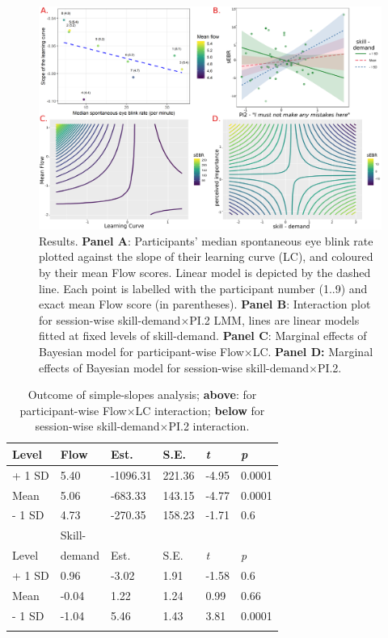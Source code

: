 \documentclass[10pt,letterpaper,floatsintext]{article}
\begin{document}
\begin{figure}[!t]
	\centering
	\includegraphics[width=\textwidth]{sEBR_RQ1-2_results}
	\caption{Results. \textbf{Panel A}: Participants' median spontaneous eye blink rate plotted against the slope of their learning curve (LC), and coloured by their mean Flow scores. Linear model is depicted by the dashed line. Each point is labelled with the participant number (1..9) and exact mean Flow score (in parentheses). \textbf{Panel B}: Interaction plot for session-wise skill-demand$\times$PI.2 LMM, lines are linear models fitted at fixed levels of skill-demand. \textbf{Panel C}: Marginal effects of Bayesian model for participant-wise Flow$\times$LC. \textbf{Panel D:} Marginal effects of Bayesian model for session-wise skill-demand$\times$PI.2.}
	\label{fig:EBRvLC}
\end{figure}


\begin{table}[!hb]
\centering
\caption{Outcome of simple-slopes analysis; \textbf{above}: for participant-wise Flow$\times$LC interaction; \textbf{below} for session-wise skill-demand$\times$PI.2 interaction.}
\begin{tabular}{llllll}
\hline
Level  & Flow & Est.     & S.E.   & \textit{t} & \textit{p} \\
\hline
+ 1 SD & 5.40 & -1096.31 & 221.36 & -4.95 & 0.0001 \\
Mean   & 5.06 &  -683.33 & 143.15 & -4.77 & 0.0001 \\
- 1 SD & 4.73 &  -270.35 & 158.23 & -1.71 & 0.6 \\
\hline
       & Skill- &      &      &            & \\
Level  & demand & Est. & S.E. & \textit{t} & \textit{p} \\
\hline
+ 1 SD & 0.96 &    -3.02 &   1.91 & -1.58 & 0.6 \\
Mean   &-0.04 &     1.22 &   1.24 &  0.99 & 0.66 \\
- 1 SD &-1.04 &     5.46 &   1.43 &  3.81 & 0.0001 \\
\hline
\label{tab:simpslopes}
\end{tabular}
\end{table}
\end{document}
